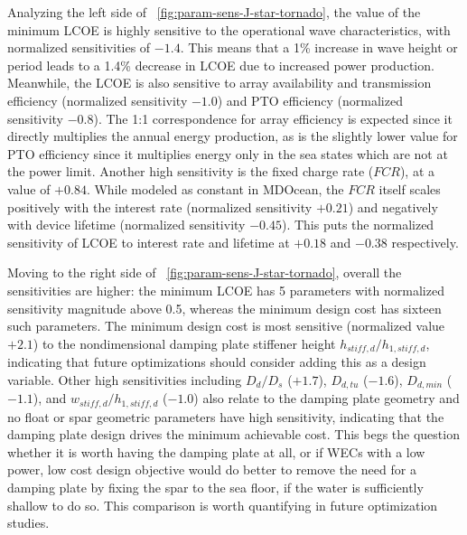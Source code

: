 Analyzing the left side of \figureautorefname~\ref{fig:param-sens-J-star-tornado}, the value of the minimum LCOE is highly sensitive to the operational wave characteristics, with normalized sensitivities of $-1.4$.
This means that a 1\% increase in wave height or period leads to a 1.4\% decrease in LCOE due to increased power production.
Meanwhile, the LCOE is also sensitive to array availability and transmission efficiency (normalized sensitivity $-1.0$) and PTO efficiency (normalized sensitivity $-0.8$).
The 1:1 correspondence for array efficiency is expected since it directly multiplies the annual energy production, as is the slightly lower value for PTO efficiency since it multiplies energy only in the sea states which are not at the power limit.
Another high sensitivity is the fixed charge rate ($FCR$), at a value of $+0.84$.
While modeled as constant in MDOcean, the $FCR$ itself scales positively with the interest rate (normalized sensitivity $+0.21$) and negatively with device lifetime (normalized sensitivity $-0.45$).
This puts the normalized sensitivity of LCOE to interest rate and lifetime at $+0.18$ and $-0.38$ respectively.

Moving to the right side of \figureautorefname~\ref{fig:param-sens-J-star-tornado}, overall the sensitivities are higher: the minimum LCOE has 5 parameters with normalized sensitivity magnitude above 0.5, whereas the minimum design cost has sixteen such parameters.
The minimum design cost is most sensitive (normalized value $+2.1$) to the nondimensional damping plate stiffener height $h_{stiff,d}/h_{1,stiff,d}$, indicating that future optimizations should consider adding this as a design variable.
Other high sensitivities including $D_d/D_s$ ($+1.7$), $D_{d,tu}$ ($-1.6$), $D_{d,min}$ ($-1.1$), and $w_{stiff,d}/h_{1,stiff,d}$ ($-1.0$) also relate to the damping plate geometry and no float or spar geometric parameters have high sensitivity, indicating that the damping plate design drives the minimum achievable cost.
This begs the question whether it is worth having the damping plate at all, or if WECs with a low power, low cost design objective would do better to remove the need for a damping plate by fixing the spar to the sea floor, if the water is sufficiently shallow to do so.
This comparison is worth quantifying in future optimization studies. 


